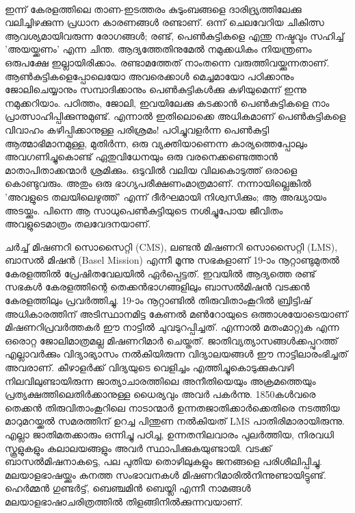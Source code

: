 \paragraph{}ഇന്ന് കേരളത്തിലെ താണ-ഇടത്തരം കുടുംബങ്ങളെ ദാരിദ്യ്രത്തിലേക്കു വലിച്ചിഴക്കുന്ന പ്രധാന കാരണങ്ങൾ രണ്ടാണ്. ഒന്ന് ചെലവേറിയ ചികിത്സ ആവശ്യമായിവരുന്ന രോഗങ്ങൾ; രണ്ട്, പെൺകുട്ടികളെ എന്തു നഷ്ടവും സഹിച്ച് 'അയയ്ക്കണം' എന്ന ചിന്ത. ആദ്യത്തേതിനുമേൽ നമുക്കധികം നിയന്ത്രണം ഒരുപക്ഷേ ഇല്ലായിരിക്കാം. രണ്ടാമത്തേത് നാംതന്നെ വരുത്തിവയ്ക്കുന്നതാണ്. ആൺകുട്ടികളെപ്പോലെയോ അവരെക്കാൾ മെച്ചമായോ പഠിക്കാനും ജോലിചെയ്യാനും സമ്പാദിക്കാനും പെൺകുട്ടികൾക്കു കഴിയുമെന്ന് ഇന്നു നമുക്കറിയാം. പഠിത്തം, ജോലി, ഇവയിലേക്കു കടക്കാൻ പെൺകുട്ടികളെ നാം പ്രാത്സാഹിപ്പിക്കുന്നുമുണ്ട്. എന്നാൽ ഇതിലൊക്കെ അധികമാണ് പെൺകുട്ടികളെ വിവാഹം കഴിപ്പിക്കാനുള്ള പരിശ്രമം! പഠിച്ചുവളർന്ന പെൺകുട്ടി ആത്മാഭിമാനമുള്ള, മുതിർന്ന, ഒരു വ്യക്തിയാണെന്ന കാര്യത്തെപ്പോലും അവഗണിച്ചുകൊണ്ട് ഏതുവിധേനയും ഒരു വരനെക്കണ്ടെത്താൻ മാതാപിതാക്കന്മാർ ശ്രമിക്കും. ഒടുവിൽ വലിയ വിലകൊടുത്ത് ഒരാളെ കൊണ്ടുവരും. അതും ഒരു ഭാഗ്യപരീക്ഷണംമാത്രമാണ്. നന്നായില്ലെങ്കിൽ 'അവളുടെ തലയിലെഴുത്ത്' എന്ന് ദീർഘമായി നിശ്വസിക്കും; ആ അദ്ധ്യായം അടയ്ക്കും. പിന്നെ ആ സാധുപെൺകുട്ടിയുടെ നശിച്ചുപോയ ജീവിതം അവളുടെമാത്രം തലവേദനയാണ്.


\label{ch5box1} %
\begin{tcolorbox}[%
 breakable, %
  arc=0mm, 
  left=1pt, right = 1pt, 
  boxrule=0mm,
  colback = {blue!10}, %
] 


ചർച്ച് മിഷണറി സൊസൈറ്റി (CMS), ലണ്ടൻ മിഷണറി സൊസൈറ്റി (LMS), ബാസൽ മിഷൻ (Basel Mission) എന്നീ മൂന്നു സഭകളാണ് 19-ാം നൂറ്റാണ്ടുമുതൽ കേരളത്തിൽ പ്രേഷിതവേലയിൽ ഏർപ്പെട്ടത്. ഇവയിൽ ആദ്യത്തെ രണ്ട് സഭകൾ കേരളത്തിന്റെ തെക്കൻഭാഗങ്ങളിലും ബാസൽമിഷൻ വടക്കൻ കേരളത്തിലും പ്രവർത്തിച്ചു. 19-ാം നൂറ്റാണ്ടിൽ തിരുവിതാംകൂറിൽ ബ്രിട്ടിഷ് അധികാരത്തിന് അടിസ്ഥാനമിട്ട കേണൽ മൺറോയുടെ ഒത്താശയോടെയാണ് മിഷണറിപ്രവർത്തകർ ഈ നാട്ടിൽ ചുവടുറപ്പിച്ചത്. എന്നാൽ മതംമാറ്റുക എന്ന ഒരൊറ്റ ജോലിമാത്രമല്ല മിഷണറിമാർ ചെയ്തത്. ജാതിവ്യത്യാസങ്ങൾക്കപ്പുറത്ത് എല്ലാവർക്കും വിദ്യാഭ്യാസം നൽകിയിരുന്ന വിദ്യാലയങ്ങൾ ഈ നാട്ടിലാരംഭിച്ചത് അവരാണ്. കീഴാളർക്ക് വിദ്യയുടെ വെളിച്ചം എത്തിച്ചുകൊടുക്കുകവഴി നിലവിലുണ്ടായിരുന്ന ജാത്യാചാരത്തിലെ അനീതിയെയും അക്രമത്തെയും പ്രത്യക്ഷത്തിലെതിർക്കാനുള്ള ധൈര്യവും അവർ പകർന്നു. 1850കൾവരെ തെക്കൻ തിരുവിതാംകൂറിലെ നാടാന്മാർ ഉന്നതജാതിക്കാർക്കെതിരെ നടത്തിയ മാറുമറയ്ക്കൽ സമരത്തിന് ഉറച്ച പിന്തുണ നൽകിയത് LMS പാതിരിമാരായിരുന്നു. എല്ലാ ജാതിമതക്കാരും ഒന്നിച്ചു പഠിച്ച, ഉന്നതനിലവാരം പുലർത്തിയ, നിരവധി സ്കൂളുകളും കലാലയങ്ങളും അവർ സ്ഥാപിക്കുകയുണ്ടായി. വടക്ക് ബാസൽമിഷനാകട്ടെ, പല പുതിയ തൊഴിലുകളും ജനങ്ങളെ പരിശീലിപ്പിച്ചു. മലയാളഭാഷയ്ക്കും കനത്ത സംഭാവനകൾ മിഷണറിമാരിൽനിന്നുണ്ടായിട്ടുണ്ട്. ഹെർമ്മൻ ഗുണ്ടർട്ട്, ബെഞ്ചമിൻ ബെയ്ലി എന്നീ നാമങ്ങൾ മലയാളഭാഷാചരിത്രത്തിൽ തിളങ്ങിനിൽക്കുന്നവയാണ്.

\end{tcolorbox}

